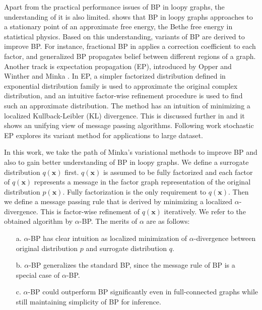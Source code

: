 \documentclass[conference]{IEEEtran}
\begin{document}
Apart from the practical performance issues of BP in loopy graphs, the understanding of it is also limited. \cite{Yedidia:2000:GBP:3008751.3008848} shows that BP in loopy graphs approaches to a stationary point of an approximate free energy, the Bethe free energy in statistical physics. Based on this understanding, variants of BP are derived to improve BP. For instance, fractional BP in \cite{Wiegerinck:2002:FBP:2968618.2968673} applies a correction coefficient to each factor, and generalized BP \cite{Yedidia:2000:GBP:3008751.3008848} propagates belief between different regions of a graph. Another track is expectation propagation (EP), introduced by Opper and Winther \cite{Opper:2000:GPC:1121900.1121911} and Minka \cite{Minka:2001:EPA:647235.720257, Minka:2001:FAA:935427}. In EP, a simpler factorized distribution defined in exponential distribution family is used to approximate the original complex distribution, and an intuitive factor-wise refinement procedure is used to find such an approximate distribution. The method has an intuition of minimizing a localized Kullback-Leibler (KL) divergence. This is discussed further in \cite{divergence-measures-and-message-passing} and it shows an unifying view of message passing algorithms. Following work stochastic EP \cite{yingzhen2015sep} explores its variant method for applications to large dataset.

In this work, we take the path of Minka's variational methods to improve BP and also to gain better understanding of BP in loopy graphs.
We define a surrogate distribution $q(\bm{x})$ first. $q(\bm{x})$ is assumed to be fully factorized and each factor of $q(\bm{x})$ represents a message in the factor graph representation of the original distribution $p(\bm{x})$. Fully factorization is the only requirement to $q(\bm{x})$. Then we define a message passing rule that is derived by minimizing a localized $\alpha$-divergence. This is factor-wise refinement of $q(\bm{x})$ iteratively. We refer to the obtained algorithm by $\alpha$-BP. The merits of $\alpha$ are as follows:
\begin{itemize}
\item[a.]{$\alpha$-BP has clear intuition as localized minimization of $\alpha$-divergence between original distribution $p$ and surrogate distribution $q$.}
\item[b.]{$\alpha$-BP generalizes the standard BP, since the message rule of BP is a special case of $\alpha$-BP.}
\item[c.]{$\alpha$}-BP could outperform BP significantly even in full-connected graphs while still maintaining simplicity of BP for inference. 
\end{itemize}
\end{document}
